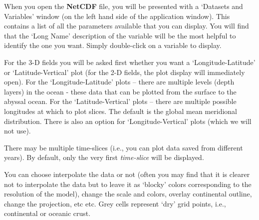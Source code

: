 \vspace{1mm}

\noindent When you open the \textbf{NetCDF} file, you will be presented with a ‘\textsf{\footnotesize Datasets and Variables}’ window (on the left hand side of the application window). This contains a list of all the parameters available that you can display. You will find that the ‘\textsf{\footnotesize Long Name}’ description of the variable will be the most helpful to identify the one you want. Simply double-click on a variable to display. 

For the 3-D fields you will be asked first whether you want a ‘\textsf{\footnotesize \footnotesize Longitude-Latitude}’ or ‘\textsf{\footnotesize Latitude-Vertical}’ plot (for the 2-D fields, the plot display will immediately open).
For the ‘\textsf{\footnotesize Longitude-Latitude}’ plots – there are multiple levels (depth layers) in the ocean - these data that can be plotted from the surface to the abyssal ocean. For the ‘\textsf{\footnotesize Latitude-Vertical}' plots – there are multiple possible longitudes at which to plot slices. The default is the global mean meridional distribution. There is also an option for ‘\textsf{\footnotesize Longitude-Vertical}' plots (which we will not use).

There may be multiple time-slices (i.e., you can plot data saved from different years). By default, only the very first \textit{time-slice} will be displayed.

You can choose interpolate the data or not (often you may find that it is clearer not to interpolate the data but to leave it as ‘blocky’ colors corresponding to the resolution of the model), change the scale and colors, overlay continental outline, change the projection, etc etc. Grey cells represent ‘dry’ grid points, i.e., continental or oceanic crust.

